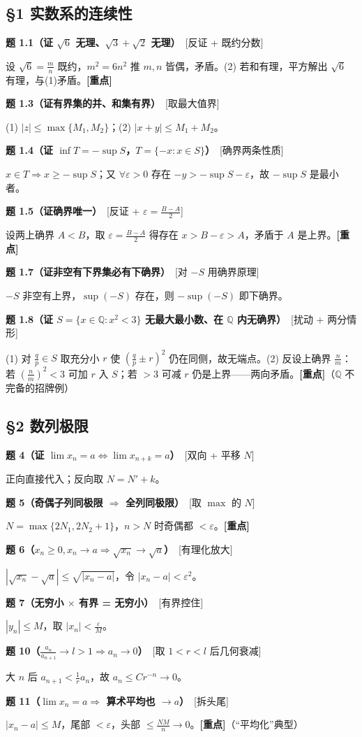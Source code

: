 \documentclass[11pt,a4paper,UTF8]{ctexart}
\newcommand{\eps}{\varepsilon}
\newcommand{\p}[2]{\par\smallskip\noindent\textbf{#1}\ \textcolor{blue!55!black}{[#2]}\par\nopagebreak}
\begin{document}
\subsection*{§1 实数系的连续性}
\p{题 1.1（证 $\sqrt6$ 无理、$\sqrt3+\sqrt2$ 无理）}{反证 + 既约分数}
设 $\sqrt6=\frac mn$ 既约，$m^2=6n^2$ 推 $m,n$ 皆偶，矛盾。(2) 若和有理，平方解出 $\sqrt6$ 有理，与(1)矛盾。\textbf{[重点]}

\p{题 1.3（证有界集的并、和集有界）}{取最大值界}
(1) $|z|\le\max\{M_1,M_2\}$；(2) $|x+y|\le M_1+M_2$。

\p{题 1.4（证 $\inf T=-\sup S$，$T=\{-x:x\in S\}$）}{确界两条性质}
$x\in T\Rightarrow x\ge-\sup S$；又 $\forall\eps>0$ 存在 $-y>-\sup S-\eps$，故 $-\sup S$ 是最小者。

\p{题 1.5（证确界唯一）}{反证 + $\eps=\frac{B-A}2$}
设两上确界 $A<B$，取 $\eps=\frac{B-A}2$ 得存在 $x>B-\eps>A$，矛盾于 $A$ 是上界。\textbf{[重点]}

\p{题 1.7（证非空有下界集必有下确界）}{对 $-S$ 用确界原理}
$-S$ 非空有上界，$\sup(-S)$ 存在，则 $-\sup(-S)$ 即下确界。

\p{题 1.8（证 $S=\{x\in\mathbb Q:x^2<3\}$ 无最大最小数、在 $\mathbb Q$ 内无确界）}{扰动 + 两分情形}
(1) 对 $\frac qp\in S$ 取充分小 $r$ 使 $(\frac qp\pm r)^2$ 仍在同侧，故无端点。(2) 反设上确界 $\frac nm$：若 $(\frac nm)^2<3$ 可加 $r$ 入 $S$；若 $>3$ 可减 $r$ 仍是上界——两向矛盾。\textbf{[重点]}（$\mathbb Q$ 不完备的招牌例）

\subsection*{§2 数列极限}
\p{题 4（证 $\lim x_n=a\iff\lim x_{n+k}=a$）}{双向 + 平移 $N$}
正向直接代入；反向取 $N=N'+k$。

\p{题 5（奇偶子列同极限 $\Rightarrow$ 全列同极限）}{取 $\max$ 的 $N$}
$N=\max\{2N_1,2N_2+1\}$，$n>N$ 时奇偶都 $<\eps$。\textbf{[重点]}

\p{题 6（$x_n\ge0,x_n\to a\Rightarrow\sqrt{x_n}\to\sqrt a$）}{有理化放大}
$|\sqrt{x_n}-\sqrt a|\le\sqrt{|x_n-a|}$，令 $|x_n-a|<\eps^2$。

\p{题 7（无穷小 $\times$ 有界 = 无穷小）}{有界控住}
$|y_n|\le M$，取 $|x_n|<\frac\eps M$。

\p{题 10（$\frac{a_n}{a_{n+1}}\to l>1\Rightarrow a_n\to0$）}{取 $1<r<l$ 后几何衰减}
大 $n$ 后 $a_{n+1}<\frac1r a_n$，故 $a_n\le C r^{-n}\to0$。

\p{题 11（$\lim x_n=a\Rightarrow$ 算术平均也 $\to a$）}{拆头尾}
$|x_n-a|\le M$，尾部 $<\eps$，头部 $\le\frac{NM}n\to0$。\textbf{[重点]}（“平均化”典型）
\end{document}
